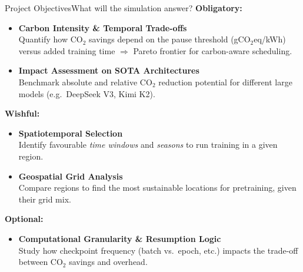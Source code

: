\begin{frame}[t]{Project Objectives}{What will the simulation answer?}
  \textbf{Obligatory:}
  \begin{itemize}
    \item \textbf{Carbon Intensity \& Temporal Trade-offs}\\
      Quantify how CO$_2$ savings depend on the pause threshold
      (gCO$_2$eq/kWh) versus added training time
      $\Rightarrow$ Pareto frontier for carbon-aware scheduling.
    \item \textbf{Impact Assessment on SOTA Architectures}\\
      Benchmark absolute and relative CO$_2$ reduction potential for
      different large models (e.g.\ DeepSeek V3, Kimi K2).
  \end{itemize}

  \vspace{0.3cm}
  \textbf{Wishful:}
  \begin{itemize}
    \item \textbf{Spatiotemporal Selection}\\
      Identify favourable \emph{time windows} and \emph{seasons}
      to run training in a given region.
    \item \textbf{Geospatial Grid Analysis}\\
      Compare regions to find the most sustainable locations
      for pretraining, given their grid mix.
  \end{itemize}

  \vspace{0.3cm}
  \textbf{Optional:}
  \begin{itemize}
    \item \textbf{Computational Granularity \& Resumption Logic}\\
      Study how checkpoint frequency (batch vs.\ epoch, etc.)
      impacts the trade-off between CO$_2$ savings and overhead.
  \end{itemize}

\end{frame}
